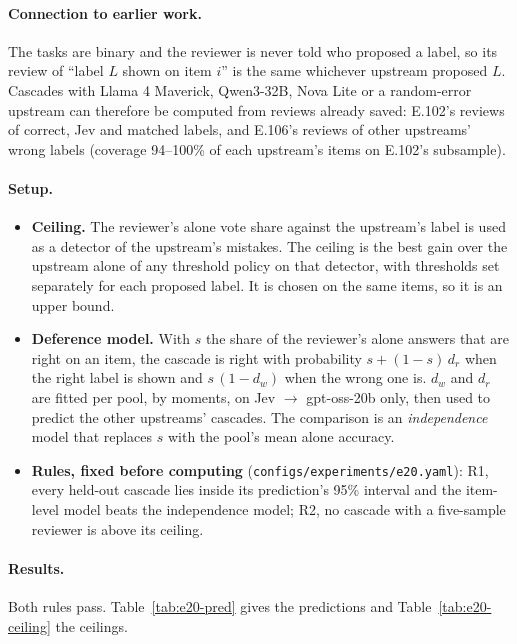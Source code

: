 \documentclass[11pt]{article}
\renewcommand{\_}{\origunderscore\allowbreak}
\begin{document}
\paragraph{Connection to earlier work.}
The tasks are binary and the reviewer is never told who proposed a label, so its review of ``label $L$ shown on item $i$'' is the same whichever upstream proposed $L$. Cascades with Llama 4 Maverick, Qwen3-32B, Nova Lite or a random-error upstream can therefore be computed from reviews already saved: E.102's reviews of correct, Jev and matched labels, and E.106's reviews of other upstreams' wrong labels (coverage 94--100\% of each upstream's items on E.102's subsample).

\paragraph{Setup.}
\begin{itemize}[leftmargin=*]
  \item \textbf{Ceiling.} The reviewer's alone vote share against the upstream's label is used as a detector of the upstream's mistakes. The ceiling is the best gain over the upstream alone of any threshold policy on that detector, with thresholds set separately for each proposed label. It is chosen on the same items, so it is an upper bound.
  \item \textbf{Deference model.} With $s$ the share of the reviewer's alone answers that are right on an item, the cascade is right with probability $s + (1-s)\,d_r$ when the right label is shown and $s\,(1-d_w)$ when the wrong one is. $d_w$ and $d_r$ are fitted per pool, by moments, on Jev $\to$ gpt-oss-20b only, then used to predict the other upstreams' cascades. The comparison is an \emph{independence} model that replaces $s$ with the pool's mean alone accuracy.
  \item \textbf{Rules, fixed before computing} (\texttt{configs/experiments/e20.yaml}): R1, every held-out cascade lies inside its prediction's 95\% interval and the item-level model beats the independence model; R2, no cascade with a five-sample reviewer is above its ceiling.
\end{itemize}

\paragraph{Results.}
Both rules pass. Table~\ref{tab:e20-pred} gives the predictions and Table~\ref{tab:e20-ceiling} the ceilings.
\end{document}
